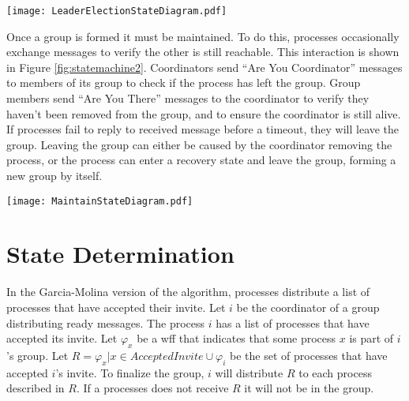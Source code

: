 \begin{figure*}[!t]
\texttt{[image: LeaderElectionStateDiagram.pdf]}
\caption{State machine of a leader election. Processes start as coordinators in the ``Normal'' state and search for other coordinators to join with. Processes immediately respond to \ac{AYC} messages they receive. The algorithm was modified by adding a ``Ready Acknowledgment'' message as the final step of completing the election. Additionally, processes only accept invites if they have received an ``\ac{AYC} Response'' message from the inviting process.}
\label{fig:statemachine}
\end{figure*}

Once a group is formed it must be maintained.
To do this, processes occasionally exchange messages to verify the other is still reachable.
This interaction is shown in Figure \ref{fig:statemachine2}.
Coordinators send ``Are You Coordinator'' messages to members of its group to check if the process has left the group.
Group members send ``Are You There'' messages to the coordinator to verify they haven't been removed from the group, and to ensure the coordinator is still alive.
If processes fail to reply to received message before a timeout, they will leave the group.
Leaving the group can either be caused by the coordinator removing the process, or the process can enter a recovery state and leave the group, forming a new group by itself.

\begin{figure*}[!t]
\texttt{[image: MaintainStateDiagram.pdf]}
\caption{State machine of maintaining a group. The \ac{AYC} messages are the same as those in Figure \ref{fig:statemachine}. \ac{AYC} and \ac{AYT} are periodically sent by processes, and responses to those messages are immediately sent by the receiving process. In the modified algorithm, the member does not enter the recovery state if they do not receive an AYT response before the timeout expires.}
\label{fig:statemachine2}
\end{figure*}

\section{State Determination}

In the Garcia-Molina version of the algorithm, processes distribute a list of processes that have accepted their invite.
Let $i$ be the coordinator of a group distributing ready messages.
The process $i$ has a list of processes that have accepted its invite.
Let $\varphi_x$ be a wff that indicates that some process $x$ is part of $i$'s group.
Let $R = {\varphi_x | x \in AcceptedInvite } \cup { \varphi_i }$ be the set of processes that have accepted $i$'s invite.
To finalize the group, $i$ will distribute $R$ to each process described in $R$.
If a processes does not receive $R$ it will not be in the group.


